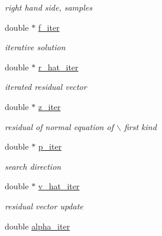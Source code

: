 \begin{CompactItemize}
\begin{CompactList}\small\item\em right hand side, samples \item\end{CompactList}\item 
\hypertarget{structinfst__adjoint__plan_o5}{
double $\ast$ \hyperlink{structinfst__adjoint__plan_o5}{f\_\-iter}}
\label{structinfst__adjoint__plan_o5}

\begin{CompactList}\small\item\em iterative solution \item\end{CompactList}\item 
\hypertarget{structinfst__adjoint__plan_o6}{
double $\ast$ \hyperlink{structinfst__adjoint__plan_o6}{r\_\-hat\_\-iter}}
\label{structinfst__adjoint__plan_o6}

\begin{CompactList}\small\item\em iterated residual vector \item\end{CompactList}\item 
\hypertarget{structinfst__adjoint__plan_o7}{
double $\ast$ \hyperlink{structinfst__adjoint__plan_o7}{z\_\-iter}}
\label{structinfst__adjoint__plan_o7}

\begin{CompactList}\small\item\em residual of normal equation of $\backslash$ first kind \item\end{CompactList}\item 
\hypertarget{structinfst__adjoint__plan_o8}{
double $\ast$ \hyperlink{structinfst__adjoint__plan_o8}{p\_\-iter}}
\label{structinfst__adjoint__plan_o8}

\begin{CompactList}\small\item\em search direction \item\end{CompactList}\item 
\hypertarget{structinfst__adjoint__plan_o9}{
double $\ast$ \hyperlink{structinfst__adjoint__plan_o9}{v\_\-hat\_\-iter}}
\label{structinfst__adjoint__plan_o9}

\begin{CompactList}\small\item\em residual vector update \item\end{CompactList}\item 
\hypertarget{structinfst__adjoint__plan_o10}{
double \hyperlink{structinfst__adjoint__plan_o10}{alpha\_\-iter}}
\label{structinfst__adjoint__plan_o10}


\end{CompactItemize}
